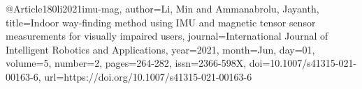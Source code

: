 @Article{180li2021imu-mag,
author={Li, Min
and Ammanabrolu, Jayanth},
title={Indoor way-finding method using IMU and magnetic tensor sensor measurements for visually impaired users},
journal={International Journal of Intelligent Robotics and Applications},
year={2021},
month={Jun},
day={01},
volume={5},
number={2},
pages={264-282},
issn={2366-598X},
doi={10.1007/s41315-021-00163-6},
url={https://doi.org/10.1007/s41315-021-00163-6}
}
